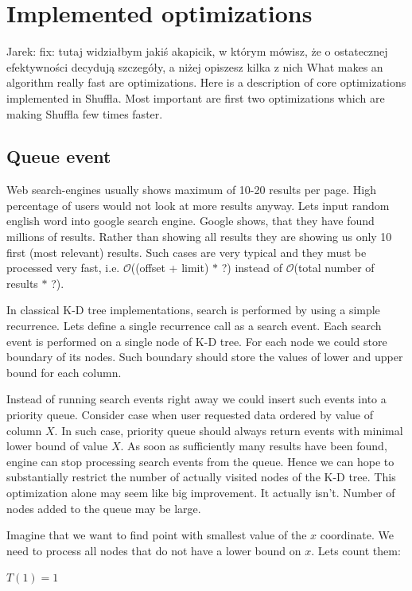 \documentclass[10pt,a4paper]{article}
\newcommand{\jarek}[1]{\noindent\colorbox{myYellow}{Jarek: #1}}
\newcommand{\Oh}{\mathcal{O}}
\begin{document}
\section{Implemented optimizations}

\jarek{fix: tutaj widziałbym jakiś akapicik, w którym mówisz, że o ostatecznej efektywności decydują szczegóły, a niżej opiszesz kilka z nich}
What makes an algorithm really fast are optimizations. Here is a description of core optimizations implemented in Shuffla. Most important are first two optimizations which are making Shuffla few times faster.

\subsection{Queue event}
Web search-engines usually shows maximum of 10-20 results per page. High percentage of users would not look at more results anyway. Lets input random english word into google search engine. Google shows, that they have found millions of results. Rather than showing all results they are showing us only 10 first (most relevant) results. Such cases are very typical and they must be processed very fast, i.e. $\Oh$((offset + limit) $*$ ?) instead of $\Oh$(total number of results $*$ ?).

In classical K-D tree implementations, search is performed by using a simple recurrence. Lets define a single recurrence call as a search event. Each search event is performed on a single node of K-D tree. For each node we could store boundary of its nodes. Such boundary should store the values of lower and upper bound for each column.

Instead of running search events right away we could insert such events into a priority queue. Consider case when user requested data ordered by value of column $X$. In such case, priority queue should always return events with minimal lower bound of value $X$. As soon as sufficiently many results have been found, engine can stop processing search events from the queue. Hence we can hope to substantially restrict the number of actually visited nodes of the K-D tree. This optimization alone may seem like big improvement. It actually isn't. Number of nodes added to the queue may be large.

Imagine that we want to find point with smallest value of the $x$ coordinate. We need to process all nodes
that do not have a lower bound on $x$. Lets count them:
\bigskip

$T(1) = 1$
\end{document}
